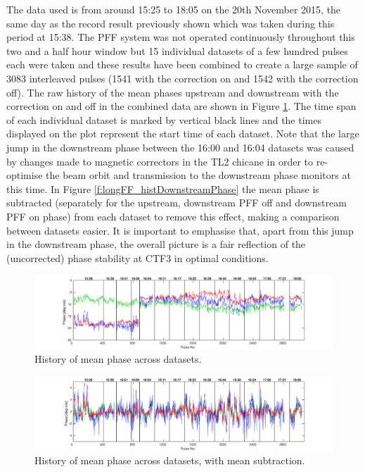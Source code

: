 The data used is from around 15:25 to 18:05 on the 20th November 2015, the same day as 
the record result previously shown which was taken during this period at 15:38. The PFF 
system was not operated continuously throughout this two and a half hour window but 15 
individual datasets of a few hundred pulses each were taken and these results have been 
combined to create a large sample of 3083 interleaved pulses (1541 with the correction 
on and 1542 with the correction off). The raw history of the mean phases upstream and 
downstream with the correction on and off in the combined data are shown in Figure 
\ref{f:longFF_noMeanSubHistory}. The time span of each individual dataset is marked by 
vertical black lines and the times displayed on the plot represent the start time of 
each dataset. Note that the large jump in the downstream phase between the 16:00 and 
16:04 datasets was caused by changes made to magnetic correctors in the TL2 chicane in 
order to re-optimise the beam orbit and transmission to the downstream phase monitors at this time. In Figure \ref{f:longFF_histDownstreamPhase} the mean phase is subtracted 
(separately for the upstream, downstream PFF off and downstream PFF on phase) from each 
dataset to remove this effect, making a comparison between datasets easier. It is 
important to emphasise that, apart from this jump in the downstream phase, the overall 
picture is a fair reflection of the (uncorrected) phase stability at CTF3 in optimal 
conditions. 


\begin{landscape}

\begin{figure}
  \centering
  \includegraphics[width=\hsize]{Figures/feedforward/longFF_noMeanSubHistory}
  \caption{History of mean phase across datasets.}
  \label{f:longFF_noMeanSubHistory}
\end{figure}


\begin{figure}
  \centering
  \includegraphics[width=\hsize]{Figures/feedforward/longFF_history}
  \caption{History of mean phase across datasets, with mean subtraction.}
  \label{f:longFF_history}
\end{figure}

\end{landscape}

